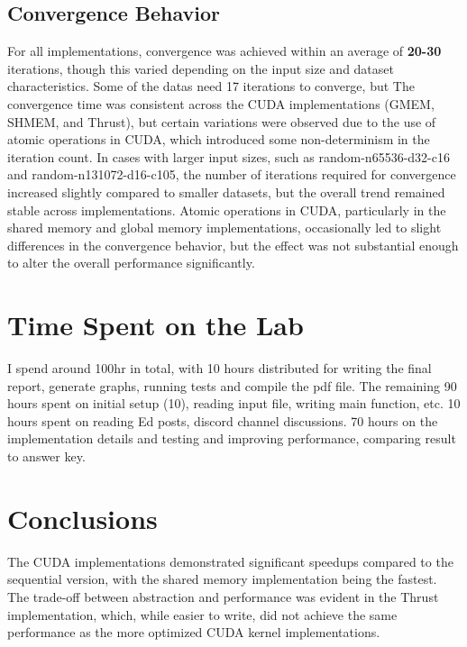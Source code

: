 \documentclass[letterpaper,12pt]{article}
\theoremstyle{remark}
\begin{document}
\subsection{Convergence Behavior} For all implementations, convergence was achieved within an average of \textbf{20-30} iterations, though this varied depending on the input size and dataset characteristics. Some of the datas need 17 iterations to converge, but The convergence time was consistent across the CUDA implementations (GMEM, SHMEM, and Thrust), but certain variations were observed due to the use of atomic operations in CUDA, which introduced some non-determinism in the iteration count. In cases with larger input sizes, such as random-n65536-d32-c16 and random-n131072-d16-c105, the number of iterations required for convergence increased slightly compared to smaller datasets, but the overall trend remained stable across implementations. Atomic operations in CUDA, particularly in the shared memory and global memory implementations, occasionally led to slight differences in the convergence behavior, but the effect was not substantial enough to alter the overall performance significantly.

\section{Time Spent on the Lab}

I spend around 100hr in total, with 10 hours distributed for writing the final report, generate graphs, running tests and compile the pdf file. The remaining 90 hours spent on initial setup (10), reading input file, writing main function, etc. 10 hours spent on reading Ed posts, discord channel discussions. 70 hours on the implementation details and testing and improving performance, comparing result to answer key.



\section*{Conclusions}

The CUDA implementations demonstrated significant speedups compared to the sequential version, with the shared memory implementation being the fastest. The trade-off between abstraction and performance was evident in the Thrust implementation, which, while easier to write, did not achieve the same performance as the more optimized CUDA kernel implementations.
\end{document}
